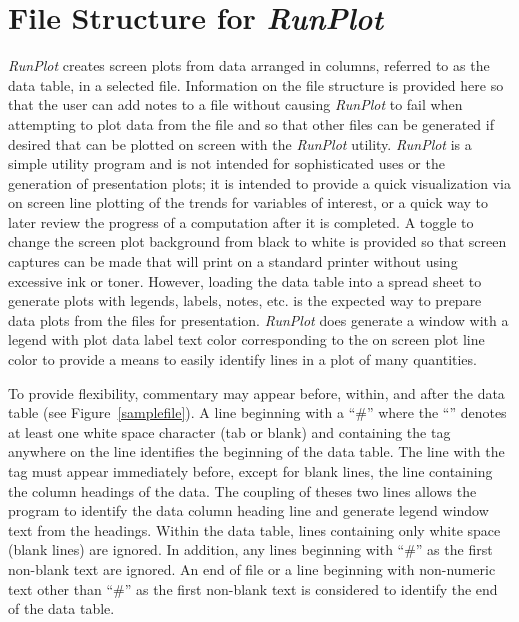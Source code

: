 \documentclass[12pt,twoside]{article}
\newcommand{\vsp}{\textvisiblespace}
\newcommand{\var}[1]{\text{\it #1}}
\newcommand{\prog}[1]{\textsl{#1}}
\numberwithin{equation}{section}
\begin{document}
\section*{File Structure for \prog{RunPlot}}
\prog{RunPlot} creates screen plots from data arranged in columns, referred to as the data table, in a selected file. Information on the file structure is provided here so that the user can add notes to a file without causing \prog{RunPlot} to fail when attempting to plot data from the file and so that other files can be generated if desired that can be plotted on screen with the \prog{RunPlot} utility. \prog{RunPlot} is a simple utility program and is not intended for sophisticated uses or the generation of presentation plots; it is intended to provide a quick visualization via on screen line plotting of the trends for variables of interest, or a quick way to later review the progress of a computation after it is completed. A toggle to change the screen plot background from black to white is provided so that screen captures can be made that will print on a standard printer without using excessive ink or toner. However, loading the data table into a spread sheet to generate plots with legends, labels, notes, etc. is the expected way to prepare data plots from the files for presentation. \prog{RunPlot} does generate a window with a legend with plot data label text color corresponding to the on screen plot line color to provide a means to easily identify lines in a plot of many quantities.

To provide flexibility, commentary may appear before, within, and after the data table (see Figure~\ref{samplefile}). A line beginning with a ``\#\vsp'' where the ``\vsp'' denotes at least one white space character (tab or blank) and containing the tag \var{plotdata} anywhere on the line identifies the beginning of the data table. The line with the \var{plotdata} tag must appear immediately before, except for blank lines, the line containing the column headings of the data. The coupling of theses two lines allows the program to identify the data column heading line and generate legend window text from the headings. Within the data table, lines containing only white space (blank lines) are ignored. In addition, any lines beginning with ``\#\vsp'' as the first non-blank text are ignored. An end of file or a line beginning with non-numeric text other than ``\#\vsp'' as the first non-blank text is considered to identify the end of the data table.
\end{document}
